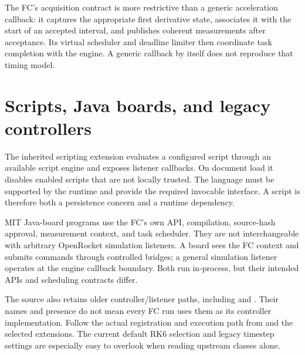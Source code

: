 The FC's acquisition contract is more restrictive than a generic acceleration callback: it captures the appropriate first derivative state, associates it with the start of an accepted interval, and publishes coherent measurements after acceptance. Its virtual scheduler and deadline limiter then coordinate task completion with the engine. A generic  callback by itself does not reproduce that timing model.


\section{Scripts, Java boards, and legacy controllers}
The inherited scripting extension evaluates a configured script through an available script engine and exposes listener callbacks. On document load it disables enabled scripts that are not locally trusted. The language must be supported by the runtime and provide the required invocable interface. A script is therefore both a persistence concern and a runtime dependency.

MIT Java-board programs use the FC's own API, compilation, source-hash approval, measurement context, and task scheduler. They are not interchangeable with arbitrary OpenRocket simulation listeners. A board sees the FC context and submits commands through controlled bridges; a general simulation listener operates at the engine callback boundary. Both run in-process, but their intended APIs and scheduling contracts differ.

The source also retains older controller/listener paths, including  and . Their names and presence do not mean every FC run uses them as its controller implementation. Follow the actual registration and execution path from  and the selected extensions. The current default RK6 selection and legacy timestep settings are especially easy to overlook when reading upstream classes alone.


